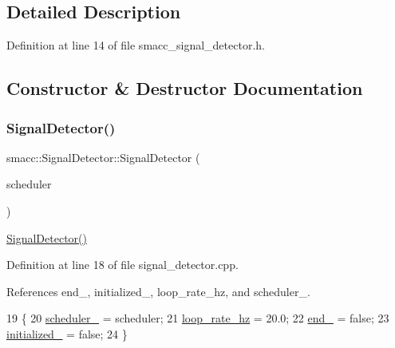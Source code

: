 \subsection{Detailed Description}


Definition at line 14 of file smacc\+\_\+signal\+\_\+detector.\+h.



\subsection{Constructor \& Destructor Documentation}
\mbox{\label{classsmacc_1_1SignalDetector_a24914014feb0ab01e2452af705ef2774}} 
\subsubsection{\texorpdfstring{Signal\+Detector()}{SignalDetector()}}
{\footnotesize\ttfamily smacc\+::\+Signal\+Detector\+::\+Signal\+Detector (\begin{DoxyParamCaption}\item[{\hyperlink{smacc__fifo__scheduler_8h_a0063e275231c80d5f97df21d17257bf7}{Smacc\+Fifo\+Scheduler} $\ast$}]{scheduler }\end{DoxyParamCaption})}

\hyperlink{classsmacc_1_1SignalDetector_a24914014feb0ab01e2452af705ef2774}{Signal\+Detector()} 

Definition at line 18 of file signal\+\_\+detector.\+cpp.



References end\+\_\+, initialized\+\_\+, loop\+\_\+rate\+\_\+hz, and scheduler\+\_\+.


\begin{DoxyCode}
19     \{
20         \hyperlink{classsmacc_1_1SignalDetector_adaee5b9b91d0e6305dc1ab30f7ab566d}{scheduler\_} = scheduler;
21         \hyperlink{classsmacc_1_1SignalDetector_a41a2ae4262ed350f46d8b886bdc1dfa5}{loop\_rate\_hz} = 20.0;
22         \hyperlink{classsmacc_1_1SignalDetector_aaee266393c01693528a2d74b1f2354a2}{end\_} = \textcolor{keyword}{false};
23         \hyperlink{classsmacc_1_1SignalDetector_a1b3c54963799b538078619906edd5302}{initialized\_} = \textcolor{keyword}{false};
24     \}
\end{DoxyCode}


